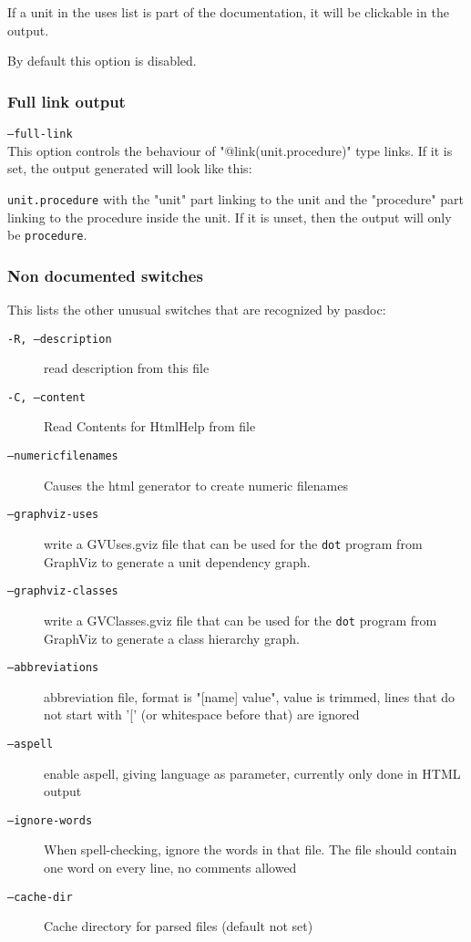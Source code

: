 \documentclass[11pt]{article}
\begin{document}
If a unit in the uses list is part of the documentation, it 
will be clickable in the output.

By default this option is disabled.

\subsubsection{Full link output}

{\tt --full-link}\\

This option controls the behaviour of "@link(unit.procedure)" type links. 
If it is set, the output generated will look like this:

{\tt unit.procedure} with the "unit" part linking to the unit and the 
"procedure" part linking to the procedure inside the unit. If it is unset, 
then the output will only be {\tt procedure}.

\subsubsection{Non documented switches}

This lists the other unusual switches that are recognized by
pasdoc:

\begin{description}
\item[{\tt -R, --description}] read description from this file
\item[{\tt -C, --content}] Read Contents for HtmlHelp from file
\item[{\tt --numericfilenames}] Causes the html generator to create numeric filenames
\item[{\tt --graphviz-uses}] write a GVUses.gviz file that can be used for the 
{\tt dot} program from GraphViz to generate a unit dependency graph.
\item[{\tt --graphviz-classes}] write a GVClasses.gviz file that can be used for the 
{\tt dot} program from GraphViz to generate a class hierarchy graph.
\item[{\tt --abbreviations}] abbreviation file, format is "[name]  value", value 
is trimmed, lines that do not start with '[' (or whitespace before that) are ignored
\item[{\tt --aspell}] enable aspell, giving language as parameter, currently only done in HTML output
\item[{\tt --ignore-words}] When spell-checking, ignore the words in that file. 
The file should contain one word on every line, no comments allowed
\item[{\tt --cache-dir}] Cache directory for parsed files (default not set)
\end{description}
\end{document}
